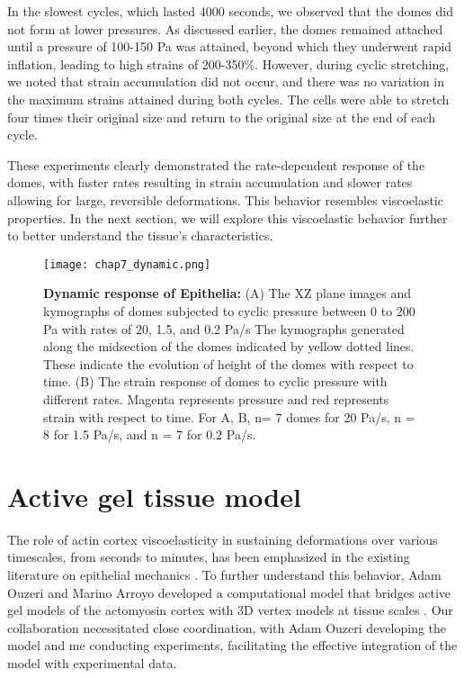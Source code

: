 In the slowest cycles, which lasted 4000 seconds, we observed that the
domes did not form at lower pressures. As discussed earlier, the domes
remained attached until a pressure of 100-150 Pa was attained, beyond
which they underwent rapid inflation, leading to high strains of
200-350\%. However, during cyclic stretching, we noted that strain
accumulation did not occur, and there was no variation in the maximum
strains attained during both cycles. The cells were able to stretch four
times their original size and return to the original size at the end of
each cycle.

These experiments clearly demonstrated the rate-dependent response of
the domes, with faster rates resulting in strain accumulation and slower
rates allowing for large, reversible deformations. This behavior
resembles viscoelastic properties. In the next section, we will explore
this viscoelastic behavior further to better understand the tissue's
characteristics.

\begin{figure}[]
	\centering
	\texttt{[image: chap7\_dynamic.png]}
	\caption{\label{fig_7_6} \textbf{Dynamic response of Epithelia:} (A) The XZ plane images and kymographs of domes subjected to cyclic pressure between 0 to 200 Pa with rates of 20, 1.5, and 0.2 Pa/s The kymographs generated along the midsection of the domes indicated by yellow dotted lines. These indicate the evolution of height of the domes with respect to time. (B) The strain response of domes to cyclic pressure with different rates. Magenta represents pressure and red represents strain with respect to time. For A, B, n= 7 domes for 20 Pa/s, n = 8 for 1.5 Pa/s, and n = 7 for 0.2 Pa/s. 
	}
\end{figure}

\hypertarget{active-gel-tissue-model}{%
	\section{Active gel tissue model}\label{active-gel-tissue-model}}

The role of actin cortex viscoelasticity in sustaining deformations over
various timescales, from seconds to minutes, has been emphasized in the
existing literature on epithelial mechanics \cite{kelkar2020, clement2017, khalilgharibi2019}. To further
understand this behavior, Adam Ouzeri and Marino Arroyo developed a
computational model that bridges active gel models of the actomyosin
cortex with 3D vertex models at tissue scales \cite{ouzeri2023}.
Our collaboration necessitated close coordination, with Adam Ouzeri
developing the model and me conducting experiments, facilitating the
effective integration of the model with experimental data.

